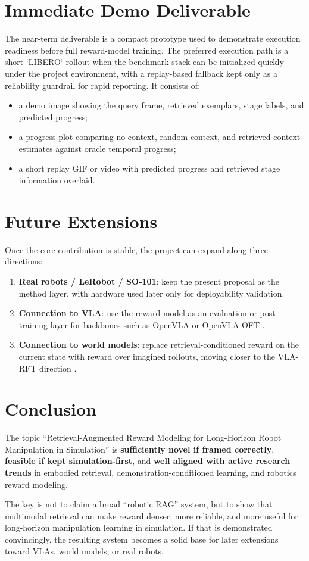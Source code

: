 \section{Immediate Demo Deliverable}

The near-term deliverable is a compact prototype used to demonstrate execution readiness before full reward-model training.
The preferred execution path is a short `LIBERO` rollout when the benchmark stack can be initialized quickly under the project environment,
with a replay-based fallback kept only as a reliability guardrail for rapid reporting.
It consists of:
\begin{itemize}
  \item a demo image showing the query frame, retrieved exemplars, stage labels, and predicted progress;
  \item a progress plot comparing no-context, random-context, and retrieved-context estimates against oracle temporal progress;
  \item a short replay GIF or video with predicted progress and retrieved stage information overlaid.
\end{itemize}

\section{Future Extensions}

Once the core contribution is stable, the project can expand along three directions:
\begin{enumerate}
  \item \textbf{Real robots / LeRobot / SO-101}: keep the present proposal as the method layer, with hardware used later only for deployability validation.
  \item \textbf{Connection to VLA}: use the reward model as an evaluation or post-training layer for backbones such as OpenVLA or OpenVLA-OFT \citep{kim2024openvla, wang2025openvlaoft}.
  \item \textbf{Connection to world models}: replace retrieval-conditioned reward on the current state with reward over imagined rollouts, moving closer to the VLA-RFT direction \citep{li2025vlarft}.
\end{enumerate}

\section{Conclusion}

The topic ``Retrieval-Augmented Reward Modeling for Long-Horizon Robot Manipulation in Simulation''
is \textbf{sufficiently novel if framed correctly}, \textbf{feasible if kept simulation-first},
and \textbf{well aligned with active research trends} in embodied retrieval,
demonstration-conditioned learning, and robotics reward modeling.

The key is not to claim a broad ``robotic RAG'' system,
but to show that multimodal retrieval can make reward denser,
more reliable, and more useful for long-horizon manipulation learning in simulation.
If that is demonstrated convincingly, the resulting system becomes a solid base
for later extensions toward VLAs, world models, or real robots.
